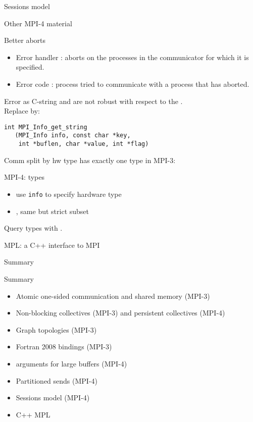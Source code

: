 \documentclass[11pt,headernav]{beamer}
\begin{document}
 {Sessions model}


 {Other MPI-4 material}

\begin{numberedframe}{Better aborts}
  \begin{itemize}
  \item Error handler
     :
     aborts on the processes in the communicator for which it is specified.
  \item
    Error code :
    process tried to communicate
    with a process that has aborted.
  \end{itemize}
\end{numberedframe}

\begin{numberedframe}{Error as C-string}
  and 
 are not robust with respect to the  .\\
 Replace by:
\begin{lstlisting}
int MPI_Info_get_string
   (MPI_Info info, const char *key, 
    int *buflen, char *value, int *flag)  
\end{lstlisting}
\end{numberedframe}

\begin{numberedframe}{Comm split by hw type}
   has exactly one type in MPI-3:

  MPI-4: types
  \begin{itemize}
  \item {} use \lstinline{info}
    to specify hardware type
  \item {},
    same but strict subset
  \end{itemize}
  Query types with .
\end{numberedframe}

 {MPL: a C++ interface to MPI}



 {Summary}

\begin{numberedframe}{Summary}
  \begin{itemize}
  \item Atomic one-sided communication and shared memory (MPI-3)
  \item Non-blocking collectives (MPI-3) and persistent collectives (MPI-4)
  \item Graph topologies (MPI-3)
  \item Fortran 2008 bindings (MPI-3)
  \item {} arguments for large buffers (MPI-4)
  \item Partitioned sends (MPI-4)
  \item Sessions model (MPI-4)
  \item C++ MPL
  \end{itemize}
\end{numberedframe}
\end{document}
